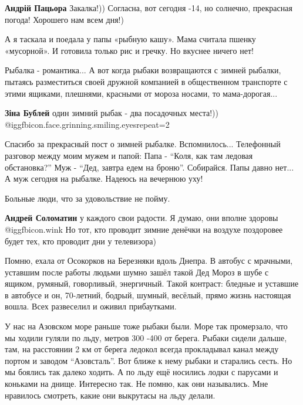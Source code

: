 \begin{itemize}
\textbf{Андрій Пацьора}
Закалка!))
Согласна, вот сегодня -14, но солнечно, прекрасная погода! Хорошего нам всем дня!)


А я таскала и поедала у папы «рыбную кашу». Мама считала пшенку «мусорной». И
готовила только рис и гречку. Но вкуснее ничего нет!


Рыбалка - романтика... А вот когда рыбаки возвращаются с зимней рыбалки,
пытаясь разместиться своей дружной компанией в общественном транспорте с этими
ящиками, плешнями, красными от мороза носами, то мама-дорогая...

\textbf{Зіна Бублей} один зимний рыбак - два посадочных места!)) @igg{fbicon.face.grinning.smiling.eyes}{repeat=2} 


Спасибо за прекрасный пост о зимней рыбалке.
Вспомнилось... Телефонный разговор между моим мужем и папой:
Папа - \enquote{Коля, как там ледовая обстановка?}
Муж - \enquote{Дед, завтра едем на броню}. Собирайся.
Папы давно нет...
А муж сегодня на рыбалке.
Надеюсь на вечернюю уху!


Больные люди, что за удовольствие не пойму.

\begin{itemize} %
\textbf{Андрей Соломатин}
у каждого свои радости.
Я думаю, они вполне здоровы @igg{fbicon.wink} 
Но тот, кто проводит зимние денёчки на воздухе поздоровее будет тех, кто проводит дни у телевизора)
\end{itemize} %


Помню, ехала от Осокорков на Березняки вдоль Днепра. В автобус с мрачными,
уставшим после работы людьми шумно зашёл такой Дед Мороз в шубе с ящиком,
румяный, говорливый, энергичный. Такой контраст: бледные и уставшие в автобусе
и он, 70-летний, бодрый, шумный, весёлый, прямо жизнь настоящая вошла. Всех
развеселил и оживил прибаутками.



У нас на Азовском море раньше тоже рыбаки были. Море так промерзало, что мы
ходили гуляли по льду, метров 300 -400 от берега. Рыбаки сидели дальше, там, на
расстоянии 2 км от берега ледокол всегда прокладывал канал между портом и
заводом \enquote{Азовсталь}. Вот ближе к нему рыбаки и старались сесть. Но мы боялись
так далеко ходить. А по льду ещё носились лодки с парусами и коньками на днище.
Интересно так. Не помню, как они назывались. Мне нравилось смотреть, какие они
выкрутасы на льду делали.


\end{itemize}

